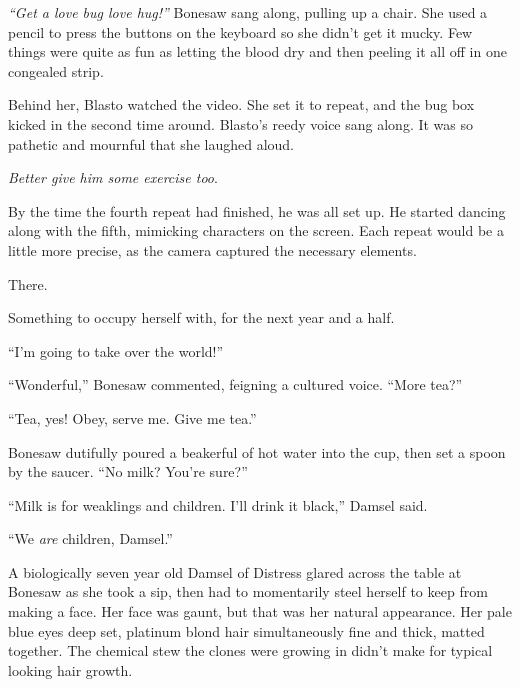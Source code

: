 \emph{``Get a love bug love hug!'' }Bonesaw sang along, pulling up a chair.  She used a pencil to press the buttons on the keyboard so she didn't get it mucky.  Few things were quite as fun as letting the blood dry and then peeling it all off in one congealed strip.



Behind her, Blasto watched the video.  She set it to repeat, and the bug box kicked in the second time around.  Blasto's reedy voice sang along.  It was so pathetic and mournful that she laughed aloud.



\emph{Better give him some exercise too}.



By the time the fourth repeat had finished, he was all set up.  He started dancing along with the fifth, mimicking characters on the screen.  Each repeat would be a little more precise, as the camera captured the necessary elements.



There.



Something to occupy herself with, for the next year and a half.



\blacksquare






``I'm going to take over the world!''



``Wonderful,'' Bonesaw commented, feigning a cultured voice.  ``More tea?''



``Tea, yes!  Obey, serve me.  Give me tea.''



Bonesaw dutifully poured a beakerful of hot water into the cup, then set a spoon by the saucer.  ``No milk?  You're sure?''



``Milk is for weaklings and children.  I'll drink it black,'' Damsel said.



``We \emph{are} children, Damsel.''



A biologically seven year old Damsel of Distress glared across the table at Bonesaw as she took a sip, then had to momentarily steel herself to keep from making a face.  Her face was gaunt, but that was her natural appearance.  Her pale blue eyes deep set, platinum blond hair simultaneously fine and thick, matted together.  The chemical stew the clones were growing in didn't make for typical looking hair growth.



